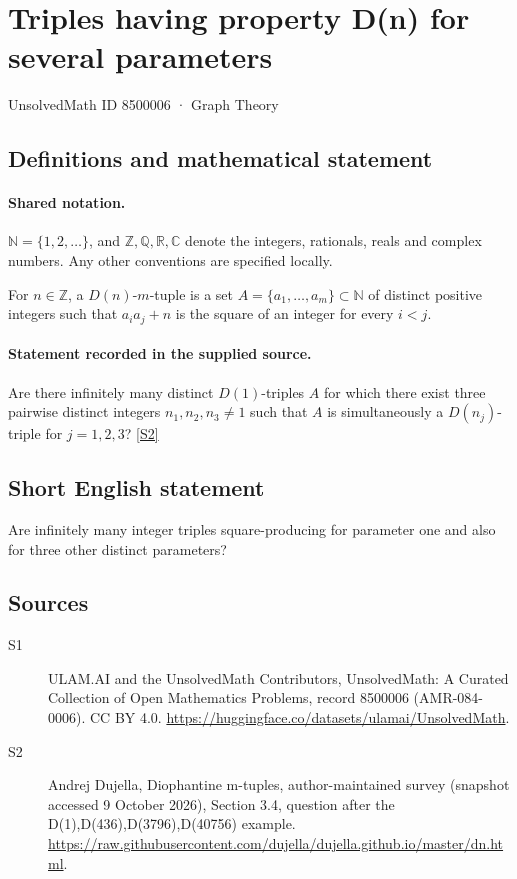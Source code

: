 \documentclass[11pt]{article}
\newcommand{\sref}[2]{\hyperlink{source:#1:#2}{[S#2]}}
\begin{document}
\setcounter{section}{8500005}
\section{Triples having property D(n) for several parameters}\label{8500006}
{\small\sffamily UnsolvedMath ID 8500006 · Graph Theory}
\subsection{Definitions and mathematical statement}

\paragraph{Shared notation.}$\mathbb N=\{1,2,\ldots\}$, and $\mathbb Z,\mathbb Q,\mathbb R,\mathbb C$ denote the integers, rationals, reals and complex numbers. Any other conventions are specified locally.


For $n\in\mathbb Z$, a $D(n)$-$m$-tuple is a set $A=\{a_1,\ldots,a_m\}\subset\mathbb N$ of distinct positive integers such that $a_i a_j+n$ is the square of an integer for every $i<j$.
\paragraph{Statement recorded in the supplied source.}
Are there infinitely many distinct $D(1)$-triples $A$ for which there exist three pairwise distinct integers $n_1,n_2,n_3\ne1$ such that $A$ is simultaneously a $D(n_j)$-triple for $j=1,2,3$? \sref{8500006}{2}
\subsection{Short English statement}
Are infinitely many integer triples square-producing for parameter one and also for three other distinct parameters?
\subsection{Sources}
\begin{description}
\item[\hypertarget{source:8500006:1}{S1}] ULAM.AI and the UnsolvedMath Contributors, UnsolvedMath: A Curated Collection of Open Mathematics Problems, record 8500006 (AMR-084-0006). CC BY 4.0. \url{https://huggingface.co/datasets/ulamai/UnsolvedMath}.
\item[\hypertarget{source:8500006:2}{S2}] Andrej Dujella, Diophantine m-tuples, author-maintained survey (snapshot accessed 9 October 2026), Section 3.4, question after the D(1),D(436),D(3796),D(40756) example. \url{https://raw.githubusercontent.com/dujella/dujella.github.io/master/dn.html}.
\end{description}
\label{end:8500006}
\end{document}
